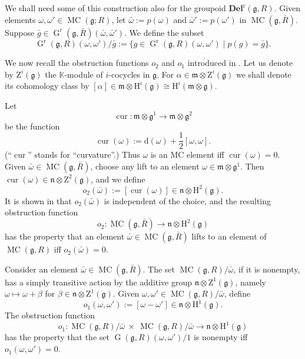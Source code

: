 \documentclass[a4paper,10pt]{amsart}
\theoremstyle{definition}
\numberwithin{equation}{section}
\newcommand{\opn}{\operatorname}
\newcommand{\mfrak}[1]{\mathfrak{#1}}
\newcommand{\mbf}[1]{\mathbf{#1}}
\newcommand{\mrm}[1]{\mathrm{#1}}
\newcommand{\mbb}[1]{\mathbb{#1}}
\newcommand{\smfrac}[2]{\textstyle \frac{#1}{#2}}
\newcommand{\ot}{\otimes}
\newcommand{\K}{\mbb{K}}
\newcommand{\g}{\mfrak{g}}
\newcommand{\m}{\mfrak{m}}
\newcommand{\n}{\mfrak{n}}
\renewcommand{\d}{\mrm{d}}
\newcommand{\om}{\omega}
\newcommand{\al}{\alpha}
\begin{document}
We shall need some of this construction also for the groupoid 
$\mbf{Del}^{\mrm{r}}(\g, R)$.
Given elements $\om, \om' \in \opn{MC}(\g; R)$, let
$\bar{\om} := p(\om)$ and $\bar{\om}' := p(\om')$ in 
$\opn{MC}(\g, \bar{R})$.
Suppose 
$\bar{g} \in \opn{G}^{\mrm{r}}(\g, \bar{R})(\bar{\om}, \bar{\om}')$.
We define the subset 
\begin{equation}
\opn{G}^{\mrm{r}}(\g, R)(\om, \om') / \bar{g} := 
\{ g \in \opn{G}^{\mrm{r}}(\g, R)(\om, \om') \mid p(g) = \bar{g} \} . 
\end{equation}

We now recall the obstruction functions $o_2$ and $o_1$ introduced in
\cite[Section 2.6]{GM}. Let us denote by 
$\mrm{Z}^i(\g)$ the $\K$-module of $i$-cocycles in $\g$. 
For $\al \in \m \otimes \mrm{Z}^i(\g)$ we shall denote its cohomology class by 
$[\al] \in \m \otimes \mrm{H}^i(\g) \cong \mrm{H}^i(\m \ot \g)$.

Let 
\[ \opn{cur} : \m \otimes \g^1 \to \m \otimes \g^2 \]
be the function 
\begin{equation} \label{eqn:36}
\opn{cur}(\om) := \d(\omega) + \smfrac{1}{2} [\omega, \omega] .
\end{equation}
(``$\opn{cur}$'' stands for ``curvature''.)
Thus $\om$ is an MC element iff $\opn{cur}(\om) = 0$.
Given $\bar{\om} \in \opn{MC}(\g, \bar{R})$, 
choose any lift to an element 
$\om \in \m \otimes \g^1$.
Then 
$\opn{cur}(\om) \in \n \otimes \mrm{Z}^2(\g)$,
and we define 
\begin{equation} \label{eqn:41}
o_2(\bar{\om}) := [\opn{cur}(\om)] \in \n \otimes \mrm{H}^2(\g) .
\end{equation}
It is shown in \cite{GM} that $o_2(\bar{\om})$
is independent of the choice, and the resulting obstruction function
\[ o_2 : \opn{MC}(\g, \bar{R}) \to 
\n \otimes \mrm{H}^2 (\g) \]
has the property that an element 
$\bar{\om} \in \opn{MC}(\g, \bar{R})$ 
lifts to an element of $\opn{MC}(\g, R)$
iff $o_2(\bar{\om}) = 0$.

Consider an element $\bar{\om} \in \opn{MC}(\g, \bar{R})$.
The set 
$\opn{MC}(\g, R) / \bar{\om}$, if it is nonempty, 
has a simply transitive action by the additive group 
$\n \otimes \mrm{Z}^1(\g)$, namely 
$\om \mapsto \om + \beta$ for $\beta \in \n \otimes \mrm{Z}^1(\g)$.
Given $\om, \om' \in \opn{MC}(\g, R) / \bar{\om}$, define 
\begin{equation} \label{eqn:42}
o_1(\om, \om') := [\om - \om'] \in \n \otimes \mrm{H}^1 (\g) .
\end{equation}
The obstruction function
\[ o_1 : \opn{MC}(\g, R) / \bar{\om} \ \times \ 
\opn{MC}(\g, R) / \bar{\om} \to 
\n \otimes \mrm{H}^1 (\g)  \]
has the property that the set 
$\opn{G}(\g, R)(\om, \om') / 1$ 
is nonempty  iff 
$o_1(\om, \om') = 0$. 
\end{document}
